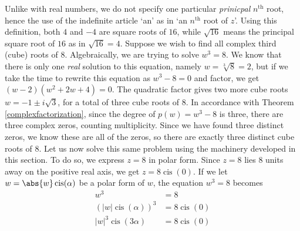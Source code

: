 Unlike with real numbers, we do not specify one particular \textit{prinicpal} $n^{\text{th}}$ root, hence the use of the indefinite article `an' as in `an $n^{\text{th}}$ root of $z$'.  Using this definition, both $4$ and $-4$ are square roots of $16$, while $\sqrt{16}$ means the principal square root of $16$ as in $\sqrt{16}= 4$.  Suppose we wish to find all complex third (cube) roots of $8$.  Algebraically, we are trying to solve $w^{3} = 8$.  We know that there is only one \textit{real} solution to this equation, namely $w = \sqrt[3]{8} = 2$, but if we take the time to rewrite this equation as $w^3 - 8 = 0$ and factor, we get $(w-2)\left(w^2 + 2w + 4\right) = 0$.  The quadratic factor gives two more cube roots $w = -1 \pm i \sqrt{3}$, for a total of three cube roots of $8$. In accordance with Theorem \ref{complexfactorization}, since the degree of $p(w) = w^3 -8$ is three, there are three complex zeros, counting multiplicity.  Since we have found three distinct zeros, we know these are all of the zeros, so there are exactly three distinct cube roots of $8$.  Let us now solve this same problem using the machinery developed in this section.  To do so, we express $z = 8$ in polar form. Since $z=8$ lies $8$ units away on the positive real axis, we get $z = 8 \operatorname{cis}(0)$.  If we let $w = \abs{w} \operatorname{cis}(\alpha)$ be a polar form of $w$, the equation $w^3 = 8$ becomes
\begin{align*}
w^3 & =  8  \\
\left(|w| \operatorname{cis}(\alpha)\right)^3 & = 8 \operatorname{cis}(0)  \\
|w|^3 \operatorname{cis}(3\alpha) & =  8 \operatorname{cis}(0)  \tag*{DeMoivre's Theorem} \\
\end{align*}

